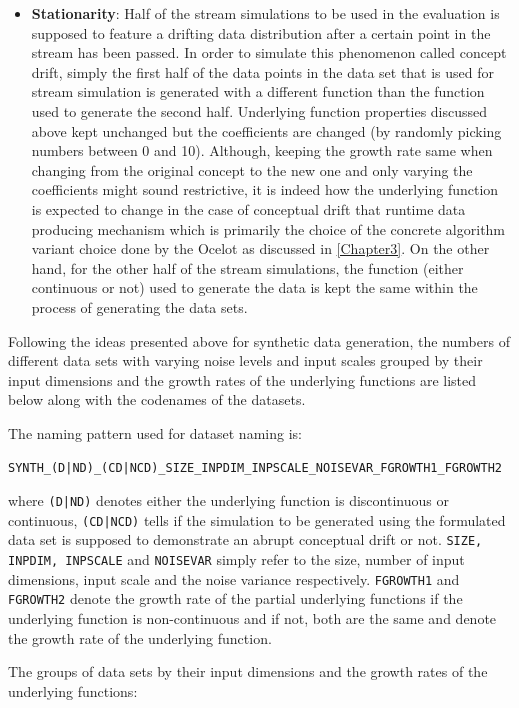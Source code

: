 \begin{itemize}
\item \textbf{Stationarity}: Half of the stream simulations to be used in the evaluation is supposed to feature a drifting data distribution after a certain point in the stream has been passed. In order to simulate this phenomenon called concept drift, simply the first half of the data points in the data set that is used for stream simulation is generated with a different function than the function used to generate the second half. Underlying function properties discussed above kept unchanged but the coefficients are changed (by randomly picking numbers between 0 and 10). Although, keeping the growth rate same when changing from the original concept to the new one and only varying the coefficients might sound restrictive, it is indeed  how the underlying function is expected to change in the case of conceptual drift that runtime data producing mechanism which is primarily the choice of the concrete algorithm variant choice done by the Ocelot as discussed in \ref{Chapter3}. On the other hand, for the other half of the stream simulations, the function (either continuous or not) used to generate the data is kept the same within the process of generating the data sets.
\end{itemize}

Following the ideas presented above for synthetic data generation, the numbers of different data sets with varying noise levels and input scales grouped by their input dimensions and the growth rates of the underlying functions are listed below along with the codenames of the datasets. 

The naming pattern used for dataset naming is:

\texttt{SYNTH\_(D|ND)\_(CD|NCD)\_SIZE\_INPDIM\_INPSCALE\_NOISEVAR\_FGROWTH1\_FGROWTH2}

where \texttt{(D|ND)} denotes either the underlying function is discontinuous or continuous, \texttt{(CD|NCD)} tells if the simulation to be generated using the formulated data set is supposed to demonstrate an abrupt conceptual drift or not. \texttt{SIZE, INPDIM, INPSCALE} and \texttt{NOISEVAR} simply refer to the size, number of input dimensions, input scale and the noise variance respectively. \texttt{FGROWTH1} and \texttt{FGROWTH2} denote the growth rate of the partial underlying functions if the underlying function is non-continuous and if not, both are the same and denote the growth rate of the underlying function.

The groups of data sets by their input dimensions and the growth rates of the underlying functions:

